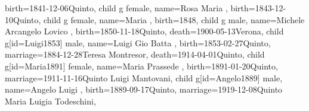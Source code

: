 \documentclass{article}
\begin{document}
\begin{midpage}
\begin{center}
\begin{genealogypicture}
{{{{{{{{{{                                        birth={1841-12-06}{Quinto},
                                    }
                                }
                                child{
                                    g{
                                        female,
                                        name={Rosa Maria },
                                        birth={1843-12-10}{Quinto},
                                    }
                                }
                                child{
                                    g{
                                        female,
                                        name={Maria },
                                        birth={1848}{},
                                    }
                                }
                                child{
                                    g{
                                        male,
                                        name={Michele Arcangelo Lovico },
                                        birth={1850-11-18}{Quinto},
                                        death={1900-05-13}{Verona},
                                    }
                                }
                                child{
                                    g[id=Luigi1853]{
                                        male,
                                        name={Luigi Gio Batta },
                                        birth={1853-02-27}{Quinto},
                                        marriage={1884-12-28}{Teresa Montresor},
                                        death={1914-04-01}{Quinto},
                                    }
                                    child{
                                        g[id=Maria1891]{
                                            female,
                                            name={Maria Prassede },
                                            birth={1891-01-20}{Quinto},
                                            marriage={1911-11-16}{Quinto \newline Luigi Mantovani},
                                        }
                                    }
                                    child{
                                        g[id=Angelo1889]{
                                            male,
                                            name={Angelo Luigi },
                                            birth={1889-09-17}{Quinto},
                                            marriage={1919-12-08}{Quinto \newline Maria Luigia Todeschini},
}}}}}}}}}}}
\end{genealogypicture}
\end{center}
\end{midpage}
\end{document}
